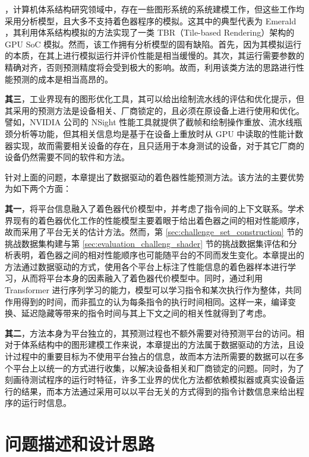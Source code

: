 {，计算机体系结构研究领域中，存在一些图形系统的系统建模工作，但这些工作均采用分析模型，且大多不支持着色器程序的模拟。这其中的典型代表为 Emerald \cite{10.1145/3307650.3322221}，其利用体系结构模拟的方法实现了一类 TBR（Tile-based Rendering）架构的 GPU SoC 模拟。然而，该工作拥有分析模型的固有缺陷。首先，因为其模拟运行的本质，在其上进行模拟运行并评价性能是相当缓慢的。其次，其运行需要参数的精确对齐，否则预测精度将会受到极大的影响。故而，利用该类方法的思路进行性能预测的成本是相当高昂的。

{\bf 其三}，工业界现有的图形优化工具，其可以给出绘制流水线的评估和优化提示，但其采用的预测方法是设备相关、厂商锁定的，且必须在原设备上进行使用和优化。譬如，NVIDIA 公司的 NSight \cite{NSightGraphics} 性能工具就提供了截帧和绘制操作重放、流水线瓶颈分析等功能，但其相关信息均是基于在设备上重放时从 GPU 中读取的性能计数器实现，故而需要相关设备的存在，且只适用于本身测试的设备，对于其它厂商的设备仍然需要不同的软件和方法。

针对上面的问题，本章提出了数据驱动的着色器性能预测方法。该方法的主要优势为如下两个方面：

{\bf 其一}，将平台信息融入了着色器代价模型中，并考虑了指令间的上下文联系。学术界现有的着色器优化工作的性能模型主要着眼于给出着色器之间的相对性能顺序，故而采用了平台无关的估计方法。然而，第 \ref{sec:challenge_set_construction} 节的挑战数据集构建与第 \ref{sec:evaluation_challeng_shader} 节的挑战数据集评估和分析表明，着色器之间的相对性能顺序也可能随平台的不同而发生变化。本章提出的方法通过数据驱动的方式，使用各个平台上标注了性能信息的着色器样本进行学习，从而将平台本身的因素融入了着色器代价模型中。同时，通过利用 Transformer 进行序列学习的能力，模型可以学习指令和某次执行作为整体，共同作用得到的时间，而非孤立的认为每条指令的执行时间相同。这样一来，编译变换、延迟隐藏等带来的指令时间与其上下文之间的相关性就得到了考虑。

{\bf 其二}，方法本身为平台独立的，其预测过程也不额外需要对待预测平台的访问。相对于体系结构中的图形建模工作来说，本章提出的方法属于数据驱动的方法，且设计过程中的重要目标为不使用平台独占的信息，故而本方法所需要的数据可以在多个平台上以统一的方式进行收集，以解决设备相关和厂商锁定的问题。同时，为了刻画待测试程序的运行时特征，许多工业界的优化方法都依赖模拟器或真实设备运行的结果，而本方法通过采用可以以平台无关的方式得到的指令计数信息来给出程序的运行时信息。
}

\section{{\amend 问题描述和设计思路}}

